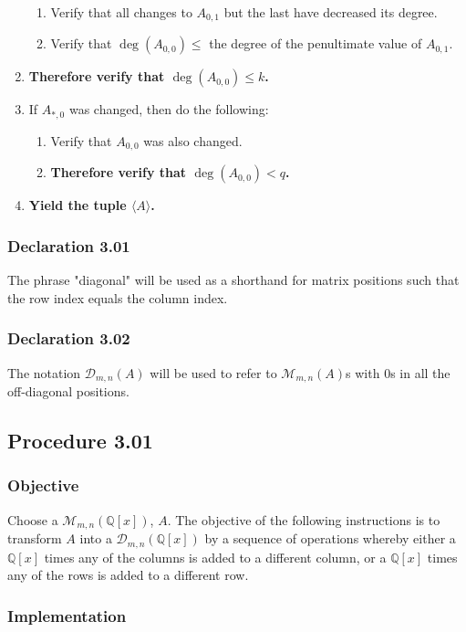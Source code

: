 \documentclass[twocolumn]{article}
\newcommand{\declaration}[1]{\subsubsection*{Declaration #1}\label{sec:declaration #1}}
\newcommand{\procedure}[2][]{\subsection*{Procedure #2 \ifthenelse{\equal{#1}{}}{}{(#1)}}\label{sec:procedure #2}}
\newcommand{\objective}{\subsubsection*{Objective}}
\newcommand{\implementation}{\subsubsection*{Implementation}}
\begin{document}
\begin{enumerate}
\begin{enumerate}
						\item Verify that all changes to $A_{0,1}$ but the last have decreased its degree.
						\item Verify that $\deg(A_{0,0})\le$ the degree of the penultimate value of $A_{0,1}$.
					\end{enumerate}
					\item \textbf{Therefore verify that $\deg(A_{0,0})\le k$.}
					\item If $A_{*,0}$ was changed, then do the following:
					\begin{enumerate}
						\item Verify that $A_{0,0}$ was also changed.
						\item \textbf{Therefore verify that $\deg(A_{0,0})<q$.}
					\end{enumerate}
					\item \textbf{Yield the tuple $\langle A\rangle$.}
				\end{enumerate}
		\declaration{3.01}
			The phrase "diagonal" will be used as a shorthand for matrix positions such that the row index equals the column index.
		\declaration{3.02}
			The notation $\mathcal{D}_{m,n}(A)$ will be used to refer to $\mathcal{M}_{m,n}(A)$s with $0$s in all the off-diagonal positions.
		\procedure{3.01}
			\objective
				Choose a $\mathcal{M}_{m,n}(\mathbb{Q}[x])$, $A$. The objective of the following instructions is to transform $A$ into a $\mathcal{D}_{m,n}(\mathbb{Q}[x])$ by a sequence of operations whereby either a $\mathbb{Q}[x]$ times any of the columns is added to a different column, or a $\mathbb{Q}[x]$ times any of the rows is added to a different row.
			\implementation
\end{document}
